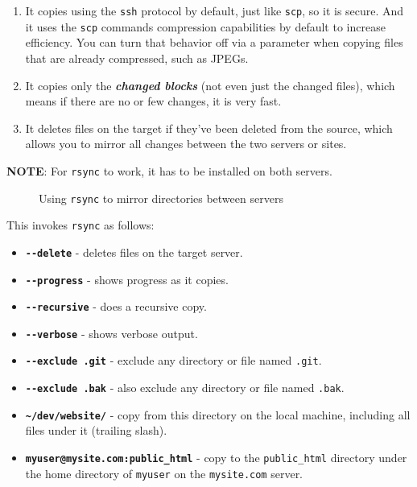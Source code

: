 \documentclass[10pt,american,]{book}
\newenvironment{Shaded}{\begin{snugshade}}{\end{snugshade}}
\newcommand{\KeywordTok}[1]{\textcolor[rgb]{0.13,0.29,0.53}{\textbf{{#1}}}}
\newcommand{\StringTok}[1]{\textcolor[rgb]{0.31,0.60,0.02}{{#1}}}
\newcommand{\NormalTok}[1]{{#1}}
\numberwithin{figure}{chapter}
\DeclareRobustCommand{\drcap}[1]{\begin{figure}[H]\caption{#1}\end{figure}}
\renewcommand{\KeywordTok}[1]{{#1}}
\renewcommand{\StringTok}[1]{{#1}}
\renewcommand{\NormalTok}[1]{{#1}}
\begin{document}
\begin{enumerate}
\def\labelenumi{\arabic{enumi}.}
\item
  It copies using the \texttt{ssh} protocol by default, just like
  \texttt{scp}, so it is secure. And it uses the \texttt{scp} commands
  compression capabilities by default to increase efficiency. You can
  turn that behavior off via a parameter when copying files that are
  already compressed, such as JPEGs.
\item
  It copies only the \textbf{\emph{changed blocks}} (not even just the
  changed files), which means if there are no or few changes, it is very
  fast.
\item
  It deletes files on the target if they've been deleted from the
  source, which allows you to mirror all changes between the two servers
  or sites.
\end{enumerate}

\textbf{NOTE}: For \texttt{rsync} to work, it has to be installed on
both servers.

\drcap{Using \texttt{rsync} to mirror directories between servers}

\begin{Shaded}
\end{Shaded}

This invokes \texttt{rsync} as follows:

\begin{itemize}
\item
  \textbf{\texttt{-\/-delete}} - deletes files on the target server.
\item
  \textbf{\texttt{-\/-progress}} - shows progress as it copies.
\item
  \textbf{\texttt{-\/-recursive}} - does a recursive copy.
\item
  \textbf{\texttt{-\/-verbose}} - shows verbose output.
\item
  \textbf{\texttt{-\/-exclude\ \textquotesingle{}.git\textquotesingle{}}}
  - exclude any directory or file named \texttt{.git}.
\item
  \textbf{\texttt{-\/-exclude\ \textquotesingle{}.bak\textquotesingle{}}}
  - also exclude any directory or file named \texttt{.bak}.
\item
  \textbf{\texttt{\textasciitilde{}/dev/website/}} - copy from this
  directory on the local machine, including all files under it (trailing
  slash).
\item
  \textbf{\texttt{myuser@mysite.com:public\_html}} - copy to the
  \texttt{public\_html} directory under the home directory of
  \texttt{myuser} on the \texttt{mysite.com} server.
\end{itemize}
\end{document}
